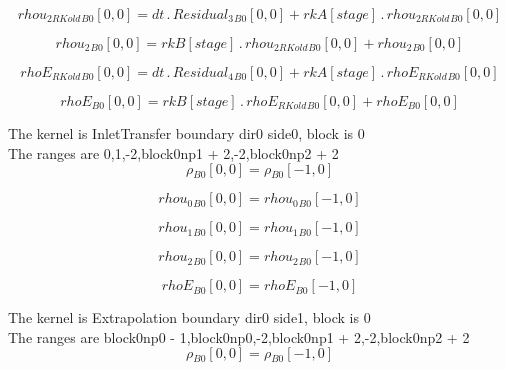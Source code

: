 \documentclass{article}
\begin{document}
\begin{dmath}{rhou_{2 RKold}{_{B0}}}[{0,0}] = dt \,.\, {Residual_{3}{_{B0}}}[{0,0}] + {rkA}[{stage}] \,.\, {rhou_{2 RKold}{_{B0}}}[{0,0}]\end{dmath}

\begin{dmath}{rhou_{2}{_{B0}}}[{0,0}] = {rkB}[{stage}] \,.\, {rhou_{2 RKold}{_{B0}}}[{0,0}] + {rhou_{2}{_{B0}}}[{0,0}]\end{dmath}

\begin{dmath}{rhoE_{RKold}{_{B0}}}[{0,0}] = dt \,.\, {Residual_{4}{_{B0}}}[{0,0}] + {rkA}[{stage}] \,.\, {rhoE_{RKold}{_{B0}}}[{0,0}]\end{dmath}

\begin{dmath}{rhoE{_{B0}}}[{0,0}] = {rkB}[{stage}] \,.\, {rhoE_{RKold}{_{B0}}}[{0,0}] + {rhoE{_{B0}}}[{0,0}]\end{dmath}

\noindent The kernel is InletTransfer boundary dir0 side0, block is 0\\\noindent The ranges are 0,1,-2,block0np1 + 2,-2,block0np2 + 2\\\begin{dmath}{\rho{_{B0}}}[{0,0}] = {\rho{_{B0}}}[{-1,0}]\end{dmath}

\begin{dmath}{rhou_{0}{_{B0}}}[{0,0}] = {rhou_{0}{_{B0}}}[{-1,0}]\end{dmath}

\begin{dmath}{rhou_{1}{_{B0}}}[{0,0}] = {rhou_{1}{_{B0}}}[{-1,0}]\end{dmath}

\begin{dmath}{rhou_{2}{_{B0}}}[{0,0}] = {rhou_{2}{_{B0}}}[{-1,0}]\end{dmath}

\begin{dmath}{rhoE{_{B0}}}[{0,0}] = {rhoE{_{B0}}}[{-1,0}]\end{dmath}

\noindent The kernel is Extrapolation boundary dir0 side1, block is 0\\\noindent The ranges are block0np0 - 1,block0np0,-2,block0np1 + 2,-2,block0np2 + 2\\\begin{dmath}{\rho{_{B0}}}[{0,0}] = {\rho{_{B0}}}[{-1,0}]\end{dmath}
\end{document}
